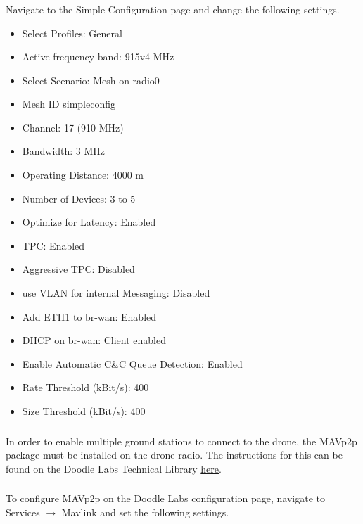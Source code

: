             \subsubsection{} Navigate to the Simple Configuration page and change the following settings.
                \begin{itemize}
                    \item Select Profiles: General
                    \item Active frequency band: 915v4 MHz
                    \item Select Scenario: Mesh on radio0
                    \item Mesh ID simpleconfig
                    \item Channel: 17 (910 MHz)
                    \item Bandwidth: 3 MHz
                    \item Operating Distance: 4000 m
                    \item Number of Devices: 3 to 5
                    \item Optimize for Latency: Enabled
                    \item TPC: Enabled
                    \item Aggressive TPC: Disabled
                    \item use VLAN for internal Messaging: Disabled
                    \item Add ETH1 to br-wan: Enabled
                    \item DHCP on br-wan: Client enabled
                    \item Enable Automatic C\&C Queue Detection: Enabled
                    \item Rate Threshold (kBit/s):  400
                    \item Size Threshold (kBit/s):  400
                \end{itemize} 
            \subsubsection{} In order to enable multiple ground stations to connect to the drone, the MAVp2p package must be installed on the drone radio. The instructions for this can be found on the Doodle Labs Technical Library \textcolor{blue}{\href{https://techlibrary.doodlelabs.com/mavp2p-guide}{here}}. 
            \subsubsection{} To configure MAVp2p on the Doodle Labs configuration page, navigate to Services $\rightarrow$ Mavlink and set the following settings.
